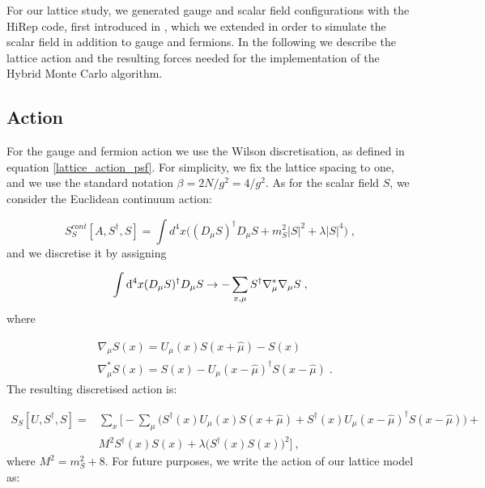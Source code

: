 For our lattice study, we generated gauge and scalar field configurations with the HiRep code, first introduced in \cite{DelDebbio:2008zf}, which we extended in order to simulate the scalar field in addition to gauge and fermions. In the following we describe the lattice action and the resulting forces needed for the implementation of the Hybrid Monte Carlo algorithm.


\subsection{Action}

For the gauge and fermion action we use the Wilson discretisation, as defined in equation \ref{lattice_action_psf}. For simplicity, we fix the lattice spacing to one, and we use the standard notation $\beta = 2 N/ g^2 = 4/g^2$. As for the scalar field $S$, we consider the Euclidean continuum action:

\begin{equation}
S_S^{cont} [A,S^{\dagger},S]= \int d^4x \biggl( (D_{\mu} S)^{\dagger} D_{\mu}S + m_S^2 |S|^ 2 + \lambda |S|^4 \biggr) \; ,
\end{equation}
%
and we discretise it by assigning 

\begin{equation}
\int \mathrm{d}^4x (D_{\mu} S)^{\dagger} D_{\mu}S \to - \sum_{x,\mu} S^{\dagger} \nabla_{\mu}^* \nabla_{\mu} S \; ,
\end{equation}
%
where

\begin{equation}
\begin{split}
&\nabla_{\mu} S(x) = U_{\mu}(x)S(x + \hat\mu) - S(x)  \\
&\nabla_{\mu}^* S(x) = S(x) - U_{\mu}(x- \hat \mu)^{\dagger} S(x- \hat \mu) \; .
\end{split}
\end{equation}
%
The resulting discretised action is: 

\begin{equation}
\begin{split}
S_S[U,S^{\dagger},S] = & \sum_x \biggl[ - \sum_{\mu} \biggl( S^{\dagger}(x) U_{\mu}(x) S(x+\hat\mu) + S^{\dagger}(x) U_{\mu}(x-\hat\mu)^{\dagger} S(x-\hat\mu) \biggr) +  \\
 & M^2 S^{\dagger}(x) S(x) + \lambda \bigl(S^{\dagger}(x) S(x) \bigr)^2 \biggr] \: ,
\end{split}
\label{scalar_lattice_action}
\end{equation}
%
where $M^2=m_S^2+8$. For future purposes, we write the action of our lattice model as:

